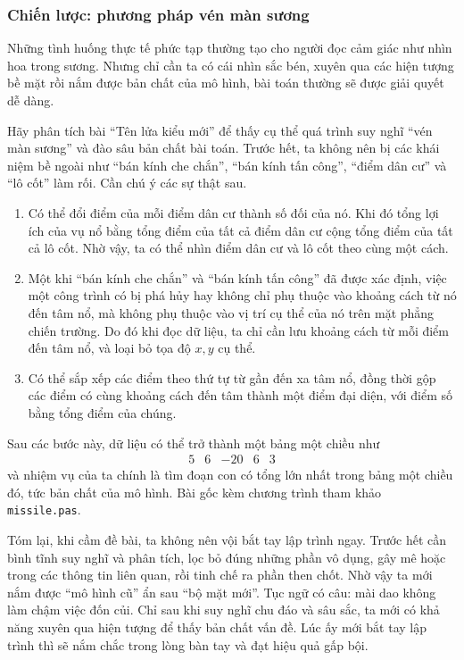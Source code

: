 \documentclass[11pt]{article}
\begin{document}
\subsubsection{Chiến lược: phương pháp vén màn sương}

Những tình huống thực tế phức tạp thường tạo cho người đọc cảm giác như nhìn
hoa trong sương. Nhưng chỉ cần ta có cái nhìn sắc bén, xuyên qua các hiện
tượng bề mặt rồi nắm được bản chất của mô hình, bài toán thường sẽ được giải
quyết dễ dàng.

Hãy phân tích bài ``Tên lửa kiểu mới'' để thấy cụ thể quá trình suy nghĩ
``vén màn sương'' và đào sâu bản chất bài toán. Trước hết, ta không nên bị
các khái niệm bề ngoài như ``bán kính che chắn'', ``bán kính tấn công'',
``điểm dân cư'' và ``lô cốt'' làm rối. Cần chú ý các sự thật sau.

\begin{enumerate}
  \item Có thể đổi điểm của mỗi điểm dân cư thành số đối của nó. Khi đó tổng
  lợi ích của vụ nổ bằng tổng điểm của tất cả điểm dân cư cộng tổng điểm của
  tất cả lô cốt. Nhờ vậy, ta có thể nhìn điểm dân cư và lô cốt theo cùng một
  cách.

  \item Một khi ``bán kính che chắn'' và ``bán kính tấn công'' đã được xác
  định, việc một công trình có bị phá hủy hay không chỉ phụ thuộc vào khoảng
  cách từ nó đến tâm nổ, mà không phụ thuộc vào vị trí cụ thể của nó trên mặt
  phẳng chiến trường. Do đó khi đọc dữ liệu, ta chỉ cần lưu khoảng cách từ
  mỗi điểm đến tâm nổ, và loại bỏ tọa độ \(x,y\) cụ thể.

  \item Có thể sắp xếp các điểm theo thứ tự từ gần đến xa tâm nổ, đồng thời
  gộp các điểm có cùng khoảng cách đến tâm thành một điểm đại diện, với điểm
  số bằng tổng điểm của chúng.
\end{enumerate}

Sau các bước này, dữ liệu có thể trở thành một bảng một chiều như
\[
  \begin{array}{ccccc}
    5 & 6 & -20 & 6 & 3
  \end{array}
\]
và nhiệm vụ của ta chính là tìm đoạn con có tổng lớn nhất trong bảng một
chiều đó, tức bản chất của mô hình. Bài gốc kèm chương trình tham khảo
\texttt{missile.pas}.

Tóm lại, khi cầm đề bài, ta không nên vội bắt tay lập trình ngay. Trước hết
cần bình tĩnh suy nghĩ và phân tích, lọc bỏ đúng những phần vô dụng, gây mê
hoặc trong các thông tin liên quan, rồi tinh chế ra phần then chốt. Nhờ vậy
ta mới nắm được ``mô hình cũ'' ẩn sau ``bộ mặt mới''. Tục ngữ có câu: mài dao
không làm chậm việc đốn củi. Chỉ sau khi suy nghĩ chu đáo và sâu sắc, ta mới
có khả năng xuyên qua hiện tượng để thấy bản chất vấn đề. Lúc ấy mới bắt tay
lập trình thì sẽ nắm chắc trong lòng bàn tay và đạt hiệu quả gấp bội.
\end{document}
